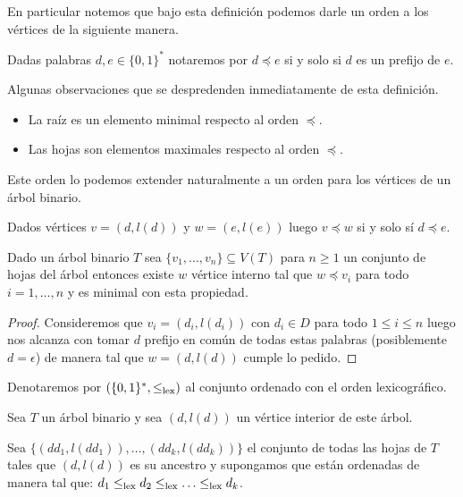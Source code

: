 \documentclass[tesis.tex]{subfiles}
\begin{document}
\begin{leoenv}
En particular notemos que bajo esta definición podemos darle un orden a los vértices de la siguiente manera.

\begin{deff}
	Dadas palabras $d,e \in \{0,1\}^{*}$ notaremos por $d \preceq e$ si y solo si $d$ es un prefijo de $e$.
\end{deff}

Algunas observaciones que se despredenden inmediatamente de esta definición.
	\begin{itemize}
		\item La raíz es un elemento minimal respecto al orden $\preceq$.
		\item Las hojas son elementos maximales respecto al orden $\preceq$.
	\end{itemize}

Este orden lo podemos extender naturalmente a un orden para los vértices de un árbol binario. 

\begin{deff}\label{deff:orden_prefijo_arbol_binario}
	Dados vértices $v =(d,l(d))$ y $w = (e,l(e))$ luego $v \preceq w$ si y solo sí $d \preceq e$.
\end{deff}

\begin{lema}\label{lema:arbol_binario_meet}
	Dado un árbol binario $T$ 
	sea $\{ v_{1}, \dots, v_{n} \} \subseteq V(T)$ para $n \ge 1$ un conjunto de hojas del árbol 
	entonces existe $w$ vértice interno tal que $w \preceq v_{i}$ para todo $i=1, \dots, n$ y es minimal con esta propiedad.
\end{lema}
\begin{proof}
	Consideremos que $v_{i} = (d_{i}, l(d_{i}))$ con $d_{i} \in D$ para todo $1 \le i \le n$ luego nos alcanza con tomar $d$ prefijo en común de todas estas palabras (posiblemente $d = \epsilon$) de manera tal que $w = (d,l(d))$ cumple lo pedido.

\end{proof}

Denotaremos por $(\{0,1 \}^{*}, \le_{\textrm{lex}})$ al conjunto ordenado con el orden lexicográfico.

\begin{deff}
	Sea $T$ un árbol binario y sea $(d,l(d))$ un vértice interior de este árbol.

	Sea $\{ (dd_{1},l(dd_{1})), \dots, (dd_{k},l(dd_{k})) \}$  el conjunto de todas las hojas de $T$ tales que $(d,l(d))$ es su ancestro y supongamos que están ordenadas de manera tal que: 
	$d_{1} \lexorder d_{2} \lexorder \dots \lexorder d_{k}$.


\end{deff}
\end{leoenv}
\end{document}
